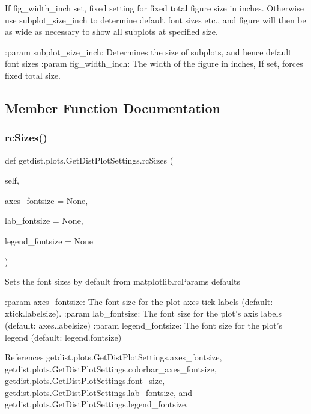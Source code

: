 \begin{DoxyVerb}If fig_width_inch set, fixed setting for fixed total figure size in inches.
Otherwise use subplot_size_inch to determine default font sizes etc.,
and figure will then be as wide as necessary to show all subplots at specified size.

:param subplot_size_inch: Determines the size of subplots, and hence default font sizes
:param fig_width_inch: The width of the figure in inches, If set, forces fixed total size.
\end{DoxyVerb}
 

\subsection{Member Function Documentation}
\mbox{\label{classgetdist_1_1plots_1_1GetDistPlotSettings_a84c44ce0f9d0d11047e20ce8b46cc4fa}} 
\subsubsection{\texorpdfstring{rc\+Sizes()}{rcSizes()}}
{\footnotesize\ttfamily def getdist.\+plots.\+Get\+Dist\+Plot\+Settings.\+rc\+Sizes (\begin{DoxyParamCaption}\item[{}]{self,  }\item[{}]{axes\+\_\+fontsize = {\ttfamily None},  }\item[{}]{lab\+\_\+fontsize = {\ttfamily None},  }\item[{}]{legend\+\_\+fontsize = {\ttfamily None} }\end{DoxyParamCaption})}

\begin{DoxyVerb}Sets the font sizes by default from matplotlib.rcParams defaults

:param axes_fontsize: The font size for the plot axes tick labels (default: xtick.labelsize).
:param lab_fontsize: The font size for the plot's axis labels (default: axes.labelsize)
:param legend_fontsize: The font size for the plot's legend (default: legend.fontsize)
\end{DoxyVerb}
 

References getdist.\+plots.\+Get\+Dist\+Plot\+Settings.\+axes\+\_\+fontsize, getdist.\+plots.\+Get\+Dist\+Plot\+Settings.\+colorbar\+\_\+axes\+\_\+fontsize, getdist.\+plots.\+Get\+Dist\+Plot\+Settings.\+font\+\_\+size, getdist.\+plots.\+Get\+Dist\+Plot\+Settings.\+lab\+\_\+fontsize, and getdist.\+plots.\+Get\+Dist\+Plot\+Settings.\+legend\+\_\+fontsize.

